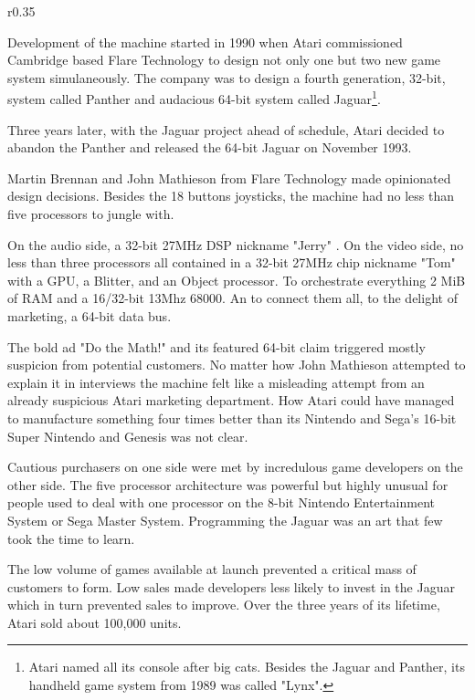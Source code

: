 \begin{wrapfigure}[5]{r}{0.35\textwidth}{
\centering {}}
\end{wrapfigure}
Development of the machine started in 1990 when Atari commissioned Cambridge based Flare Technology to design not only one but two new game system simulaneously. The company was to design a fourth generation, 32-bit, system called Panther and audacious 64-bit system called Jaguar\footnote{Atari named all its console after big cats. Besides the Jaguar and Panther, its handheld game system from 1989 was called "Lynx".}.\\
\par Three years later, with the Jaguar project ahead of schedule, Atari decided to abandon the Panther and released the 64-bit Jaguar on November 1993.\\
\par
{}
\par
Martin Brennan and John Mathieson from Flare Technology made opinionated design decisions. Besides the 18 buttons joysticks, the machine had no less than five processors to jungle with.\\
\par
On the audio side, a 32-bit 27MHz DSP nickname "Jerry" . On the video side, no less than three processors all contained in a 32-bit 27MHz chip nickname "Tom" with a GPU, a Blitter, and an Object processor. To orchestrate everything 2 MiB of RAM and a 16/32-bit 13Mhz 68000. An to connect them all, to the delight of marketing, a 64-bit data bus.\\
\par
The bold ad "Do the Math!" and its featured 64-bit claim triggered mostly suspicion from potential customers.  No matter how John Mathieson attempted to explain it in interviews the machine felt like a misleading attempt from an already suspicious Atari marketing department. How Atari could have managed to manufacture something four times better than its Nintendo and Sega's 16-bit Super Nintendo and Genesis was not clear.
\par
Cautious purchasers on one side were met by incredulous game developers on the other side. The five processor architecture was powerful but highly unusual for people used to deal with one processor on the 8-bit Nintendo Entertainment System or Sega Master System. Programming the Jaguar was an art that few took the time to learn.\\
\par
The low volume of games available at launch prevented a critical mass of customers to form. Low sales made developers less likely to invest in the Jaguar which in turn prevented sales to improve. Over the three years of its lifetime, Atari sold about 100,000 units. 


